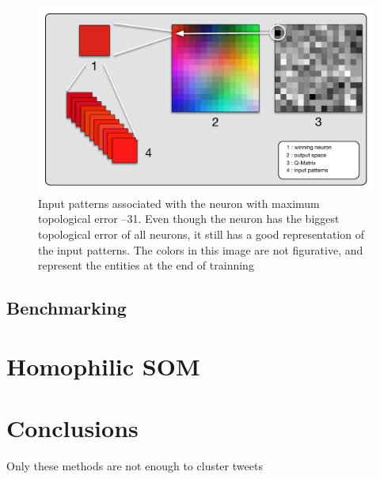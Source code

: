 \begin{figure}[htpb]
  \centering
  \includegraphics[width=0.8\linewidth]{./images/som_trainned.pdf}
  \caption{Input patterns associated with the neuron with maximum topological error --31. Even though the neuron has the biggest topological error of all neurons, it still has a good representation of the input patterns. The colors in this image are not figurative, and represent the entities at the end of trainning  }
  \label{fig:./images/som_trainned}
\end{figure}

\subsection{Benchmarking}
\label{sub:benchmarking}



\section{Homophilic SOM}
\label{sec:homophilic_som}



\section{Conclusions}
{\color{red} Only these methods are not enough to cluster tweets }

\cleardoublepage
 
